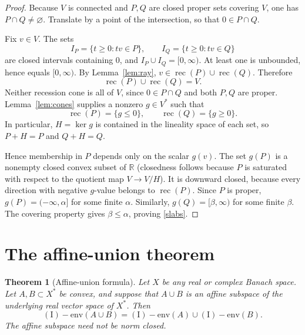 \documentclass[11pt]{article}
\newtheorem{theorem}{Theorem}[section]
\theoremstyle{remark}
\newcommand{\Ienv}{\operatorname{(I)\!\!-env}}
\newcommand{\rec}{\operatorname{rec}}
\newcommand{\R}{\mathbb{R}}
\begin{document}
\begin{proof}
Because $V$ is connected and $P,Q$ are closed proper sets covering $V$, one
has $P\cap Q\neq\varnothing$.  Translate by a point of the intersection, so
that $0\in P\cap Q$.

Fix $v\in V$.  The sets
\[
 I_P=\{t\geq0:tv\in P\},\qquad
 I_Q=\{t\geq0:tv\in Q\}
\]
are closed intervals containing $0$, and $I_P\cup I_Q=[0,\infty)$.  At
least one is unbounded, hence equals $[0,\infty)$.  By
Lemma~\ref{lem:ray}, $v\in\rec(P)\cup\rec(Q)$.  Therefore
\[
 \rec(P)\cup\rec(Q)=V.
\]
Neither recession cone is all of $V$, since $0\in P\cap Q$ and both $P,Q$
are proper.  Lemma~\ref{lem:cones} supplies a nonzero $g\in V^*$ such that
\[
 \rec(P)=\{g\leq0\},\qquad \rec(Q)=\{g\geq0\}.
\]
In particular, $H=\ker g$ is contained in the lineality space of each set,
so $P+H=P$ and $Q+H=Q$.

Hence membership in $P$ depends only on the scalar $g(v)$.  The set $g(P)$
is a nonempty closed convex subset of $\R$ (closedness follows because $P$
is saturated with respect to the quotient map $V\to V/H$).  It is downward
closed, because every direction with negative $g$-value belongs to
$\rec(P)$.  Since $P$ is proper, $g(P)=(-\infty,\alpha]$ for some finite
$\alpha$.  Similarly, $g(Q)=[\beta,\infty)$ for some finite $\beta$.
The covering property gives $\beta\leq\alpha$, proving \eqref{slabs}.
\end{proof}

\section{The affine-union theorem}

\begin{theorem}[Affine-union formula]
\label{thm:affine}
Let $X$ be any real or complex Banach space.  Let $A,B\subset X^*$ be
convex, and suppose that $A\cup B$ is an affine subspace of the underlying
real vector space of $X^*$.  Then
\[
 \Ienv(A\cup B)=\Ienv(A)\cup\Ienv(B).
\]
The affine subspace need not be norm closed.
\end{theorem}
\end{document}
